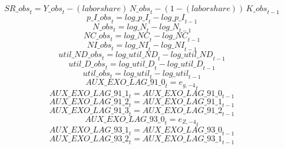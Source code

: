 \begin{dmath}
{SR\_obs}_{t}={Y\_obs}_{t}-{(labor share)}\, {N\_obs}_{t}-\left(1-{(labor share)}\right)\, {K\_obs}_{t-1}
\end{dmath}
\begin{dmath}
{p\_I\_obs}_{t}={log\_p\_I}_{t}-{log\_p\_I}_{t-1}
\end{dmath}
\begin{dmath}
{N\_obs}_{t}={log\_N}_{t}-{log\_N}_{t-1}
\end{dmath}
\begin{dmath}
{NC\_obs}_{t}={log\_NC}_{t}-{log\_NC}_{t-1}
\end{dmath}
\begin{dmath}
{NI\_obs}_{t}={log\_NI}_{t}-{log\_NI}_{t-1}
\end{dmath}
\begin{dmath}
{util\_ND\_obs}_{t}={log\_util\_ND}_{t}-{log\_util\_ND}_{t-1}
\end{dmath}
\begin{dmath}
{util\_D\_obs}_{t}={log\_util\_D}_{t}-{log\_util\_D}_{t-1}
\end{dmath}
\begin{dmath}
{util\_obs}_{t}={log\_util}_{t}-{log\_util}_{t-1}
\end{dmath}
\begin{dmath}
{AUX\_EXO\_LAG\_91\_0}_{t}={{e_{g,-4}}}_{t}
\end{dmath}
\begin{dmath}
{AUX\_EXO\_LAG\_91\_1}_{t}={AUX\_EXO\_LAG\_91\_0}_{t-1}
\end{dmath}
\begin{dmath}
{AUX\_EXO\_LAG\_91\_2}_{t}={AUX\_EXO\_LAG\_91\_1}_{t-1}
\end{dmath}
\begin{dmath}
{AUX\_EXO\_LAG\_91\_3}_{t}={AUX\_EXO\_LAG\_91\_2}_{t-1}
\end{dmath}
\begin{dmath}
{AUX\_EXO\_LAG\_93\_0}_{t}={{e_{Z,-4}}}_{t}
\end{dmath}
\begin{dmath}
{AUX\_EXO\_LAG\_93\_1}_{t}={AUX\_EXO\_LAG\_93\_0}_{t-1}
\end{dmath}
\begin{dmath}
{AUX\_EXO\_LAG\_93\_2}_{t}={AUX\_EXO\_LAG\_93\_1}_{t-1}
\end{dmath}
